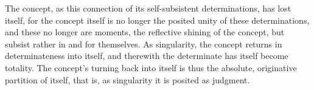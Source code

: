The concept, as this connection of
its self-subsistent determinations, has lost itself,
for the concept itself is no longer
the posited unity of these determinations,
and these no longer are moments,
the reflective shining of the concept,
but subsist rather in and for themselves.
As singularity, the concept returns
in determinateness into itself,
and therewith the determinate has
itself become totality.
The concept's turning back into itself is
thus the absolute, originative partition of itself,
that is, as singularity it is posited as judgment.